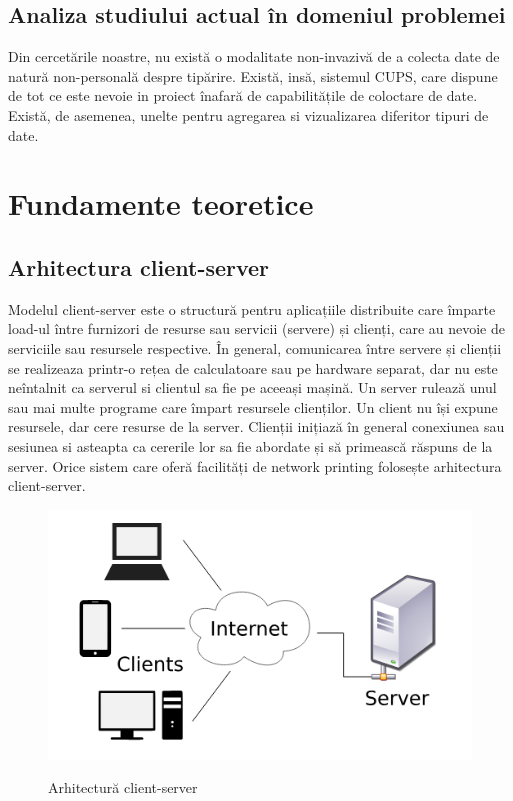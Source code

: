 \documentclass[a4paper, 12pt, twoside]{report}
\begin{document}
	\section{Analiza studiului actual în domeniul problemei}
Din cercetările noastre, nu există o modalitate non-invazivă de a colecta date de natură non-personală despre tipărire. Există, insă, sistemul CUPS, care dispune de tot ce este nevoie in proiect înafară de capabilitățile de coloctare de date. Există, de asemenea, unelte pentru agregarea si vizualizarea diferitor tipuri de date.

\chapter{Fundamente teoretice}

	\section{Arhitectura client-server}
Modelul client-server este o structură pentru aplicațiile distribuite care împarte load-ul între furnizori de resurse sau servicii (servere) și clienți, care au nevoie de serviciile sau resursele respective. În general, comunicarea între servere și clienții se realizeaza printr-o rețea de calculatoare sau pe hardware separat, dar nu este neîntalnit ca serverul si clientul sa fie pe aceeași mașină. Un server rulează unul sau mai multe programe care împart resursele clienților. Un client nu își expune resursele, dar cere resurse de la server. Clienții inițiază în general conexiunea sau sesiunea si asteapta ca cererile lor sa fie abordate și să primească răspuns de la server. Orice sistem care oferă facilități de network printing folosește arhitectura client-server.

\begin{figure}[h]
		\centering
			{\includegraphics[width=120mm]{arch.png}}
		\caption{Arhitectură client-server}
\end{figure}
\end{document}
